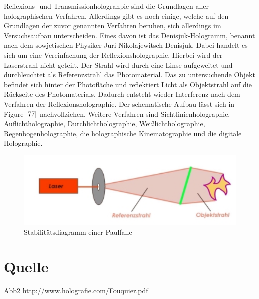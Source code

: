 \documentclass[12pt,a4paper]{article}
\begin{document}
Reflexions- und Transmissionholograhpie sind die Grundlagen aller holographischen Verfahren. Allerdings gibt es noch einige, welche auf den Grundlagen der zuvor genannten Verfahren beruhen, sich allerdings im Versuchsaufbau unterscheiden. Eines davon ist das Denisjuk-Hologramm, benannt nach dem sowjetischen Physiker Juri Nikolajewitsch Denisjuk. Dabei handelt es sich um eine Vereinfachung der Reflexionsholographie. Hierbei wird der Laserstrahl nicht geteilt. Der Strahl wird durch eine Linse aufgeweitet und durchleuchtet als Referenzstrahl das Photomaterial. Das zu untersuchende Objekt befindet sich hinter der Photofläche und reflektiert Licht als Objektstrahl auf die Rückseite des Photomaterials. Dadurch entsteht wieder Interferenz nach dem Verfahren der Reflexionsholographie. Der schematische Aufbau lässt sich in Figure $\ref{77}$ nachvollziehen. Weitere Verfahren sind Sichtlinienholographie, Auflichtholographie, Durchlichtholographie, Weißlichtholographie,  Regenbogenholographie, die holographische Kinematographie und die digitale Holographie. 

\begin{figure}[h]
	\includegraphics[scale = 0.5]{denis.png}
	\centering
	\caption{Stabilitätsdiagramm einer Paulfalle}
	\label{77}
\end{figure}
\section{Quelle}

Abb2 http://www.holografie.com/Fouquier.pdf
\end{document}
